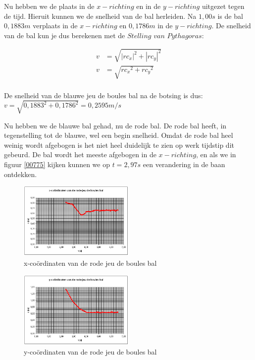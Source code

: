 \documentclass[12pt,a4paper]{article}
\begin{document}
	Nu hebben we de plaats in de $x-richting$ en in de $y-richting$ uitgezet tegen de tijd. Hieruit kunnen we de snelheid van de bal herleiden. Na $1,00s$ is de bal $0,1883m$ verplaats in de $x-richting$ en $0,1786m$ in de $y-richting$. De snelheid van de bal kun je dus berekenen met de $Stelling$ $van$ $Pythagoras$:

	\begin{equation}
		\label{snelheid}
		\begin{aligned}
			v&=\sqrt{{|rc_x|}^2+{|rc_y|}^2}\\
			v&=\sqrt{{rc_x}^2+{rc_y}^2}\\
		\end{aligned}
	\end{equation}

	De snelheid van de blauwe jeu de boules bal na de botsing is dus: $v=\sqrt{{0,1883}^2+{0,1786}^2}=0,2595m/s$

	Nu hebben we de blauwe bal gehad, nu de rode bal. De rode bal heeft, in tegenstelling tot de blauwe, wel een begin snelheid. Omdat de rode bal heel weinig wordt afgebogen is het niet heel duidelijk te zien op werk tijdstip dit gebeurd. De bal wordt het meeste afgebogen in de $x-richting$, en als we in figuur \eqref{00775} kijken kunnen we op $t=2,97s$ een verandering in de baan ontdekken.

	\begin{figure}[H]
		\centerline{\includegraphics[width=0.5\textwidth]{Plaatjes/00775.png}}
		\caption{x-co\"{o}rdinaten van de rode jeu de boules bal}
		\label{00775}
	\end{figure}
	
	\begin{figure}[H]
		\centerline{\includegraphics[width=0.5\textwidth]{Plaatjes/00776.png}}
		\caption{y-co\"{o}rdinaten van de rode jeu de boules bal}
		\label{00776}
	\end{figure}
	
\end{document}
